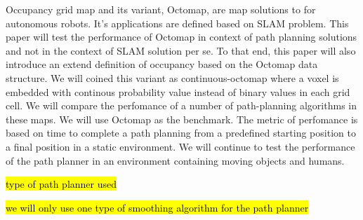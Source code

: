 \documentclass[a4paper,10pt]{article}
\DeclareRobustCommand{\hlyellow}[1]{{\sethlcolor{yellow}\hl{#1}}}
\begin{document}
Occupancy grid map and its variant, Octomap,
are map solutions to for autonomous robots. It's
applications are defined based on SLAM problem. This paper will test
the performance of Octomap in context of path planning solutions and not in
the context of
SLAM solution per se. To that end, this paper will also introduce an extend
definition of occupancy based on the Octomap data structure. We will coined
this variant as continuous-octomap where a voxel is embedded with
continous probability value instead of binary values in each grid cell. 
We will compare
the perfomance of a number of path-planning algorithms in these maps. We will
use Octomap as the
benchmark. The metric of perfomance is based on time to complete a path planning
from a predefined starting position to a final position in a static environment.
We will continue to test the performance of the path planner in an environment
containing moving objects and humans.

\hlyellow{type of path planner used}

\hlyellow{we will only use one type of smoothing algorithm for the path planner}



\end{document}
